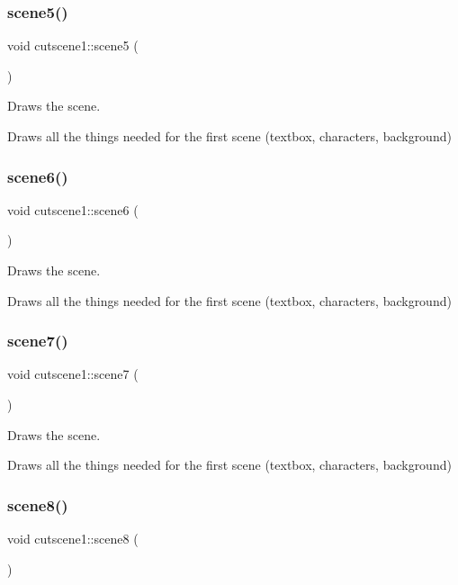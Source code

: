 \subsubsection{\texorpdfstring{scene5()}{scene5()}}
{\footnotesize\ttfamily void cutscene1\+::scene5 (\begin{DoxyParamCaption}{ }\end{DoxyParamCaption})}



Draws the scene. 

Draws all the things needed for the first scene (textbox, characters, background) \mbox{\label{classcutscene1_a2f30889d2d2d5126b99823bb81b167b3}} 
\subsubsection{\texorpdfstring{scene6()}{scene6()}}
{\footnotesize\ttfamily void cutscene1\+::scene6 (\begin{DoxyParamCaption}{ }\end{DoxyParamCaption})}



Draws the scene. 

Draws all the things needed for the first scene (textbox, characters, background) \mbox{\label{classcutscene1_a5f5798e0f4ab664320f0f35aaa22b2a3}} 
\subsubsection{\texorpdfstring{scene7()}{scene7()}}
{\footnotesize\ttfamily void cutscene1\+::scene7 (\begin{DoxyParamCaption}{ }\end{DoxyParamCaption})}



Draws the scene. 

Draws all the things needed for the first scene (textbox, characters, background) \mbox{\label{classcutscene1_a9f335e0ddd6112269bfd88a3b0cecdb5}} 
\subsubsection{\texorpdfstring{scene8()}{scene8()}}
{\footnotesize\ttfamily void cutscene1\+::scene8 (\begin{DoxyParamCaption}{ }\end{DoxyParamCaption})}




